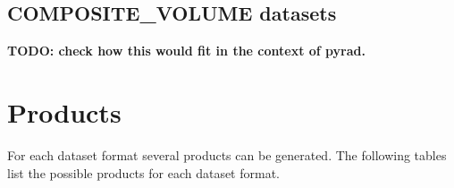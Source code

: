 \documentclass[a4paper,11pt,pdftex,twoside]{scrartcl}
\renewcommand{\bf}{\normalfont \bfseries}
\begin{document}
{{{\subsection{COMPOSITE\_VOLUME datasets}
  \label{subsec_composite_volume_dataset}
  
 {\bf TODO: check how this would fit in the context of pyrad.} 




\newpage

\section{Products}
\label{sub_products}

For each dataset format several products can be generated.
The following tables list the possible products for each dataset format.

}}}
\end{document}
